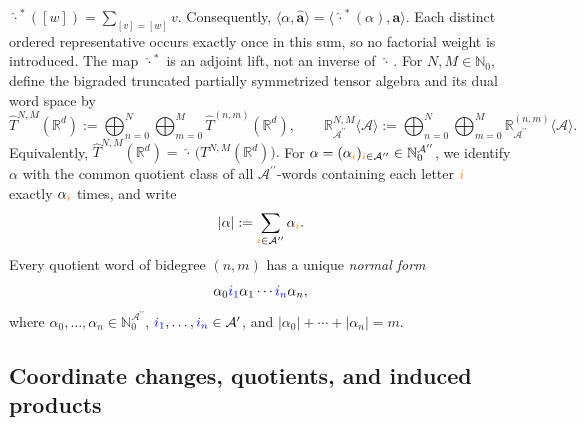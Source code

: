 \documentclass{amsart}
\theoremstyle{definition}
\theoremstyle{remark}
\newcommand{\symmetrizer}{{\,\widehat{\cdot}\,}}
\newcommand{\blue}[1]{{\color{blue}#1}}
\newcommand{\orange}[1]{{\color{orange}#1}}
\begin{document}
$\symmetrizer^{\ast}([w])=\sum_{[v]=[w]}v$. Consequently,
$\langle\alpha,\widehat{\mathbf{a}}\rangle
=\langle\symmetrizer^{\ast}(\alpha),\mathbf{a}\rangle$.
Each distinct ordered representative occurs exactly once in this sum, so no
factorial weight is introduced. The map $\symmetrizer^{\ast}$ is an adjoint
lift, not an inverse of $\symmetrizer$.
For $N,M\in\mathbb{N}_0$, define the bigraded truncated partially
symmetrized tensor algebra and its dual word space by
\[
    \widehat{T}^{N,M}(\mathbb{R}^{d})
    :=
    \bigoplus_{n=0}^{N}
    \bigoplus_{m=0}^{M}
    \widehat{T}^{(n,m)}(\mathbb{R}^{d}),
    \qquad
    \mathbb{R}_{\mathcal{A}^{\prime\prime}}^{N,M}
    \langle\mathcal{A}\rangle
    :=
    \bigoplus_{n=0}^{N}
    \bigoplus_{m=0}^{M}
    \mathbb{R}_{\mathcal{A}^{\prime\prime}}^{(n,m)}
    \langle\mathcal{A}\rangle.
\]
Equivalently,
\(
    \widehat{T}^{N,M}(\mathbb{R}^{d})
    =
    \symmetrizer
    \bigl(
        T^{N,M}(\mathbb{R}^{d})
    \bigr).
\)
For
$\alpha
=
(\alpha_{\orange{i}})_{\orange{i}\in\mathcal{A}^{\prime\prime}}
\in
\mathbb{N}_0^{\mathcal{A}^{\prime\prime}}$,
we identify $\alpha$ with the common quotient class of all
$\mathcal{A}^{\prime\prime}$-words containing each letter
$\orange{i}$ exactly $\alpha_{\orange{i}}$ times, and write
\[
    |\alpha|
    :=
    \sum_{\orange{i}\in\mathcal{A}^{\prime\prime}}
    \alpha_{\orange{i}}.
\]
Every quotient word of bidegree $(n,m)$ has a unique \emph{normal form}
\[
    \alpha_0\blue{i_1}\alpha_1\cdots
    \blue{i_n}\alpha_n,
\]
where
$\alpha_0,\ldots,\alpha_n
\in\mathbb{N}_0^{\mathcal{A}^{\prime\prime}}$,
$\blue{i_1},\ldots,\blue{i_n}\in\mathcal{A}^{\prime}$, and $|\alpha_0| + \cdots + |\alpha_n|=m$.

\subsection{Coordinate changes, quotients, and induced products}
\label{sec:coordinate_changes_and_products}
\end{document}
